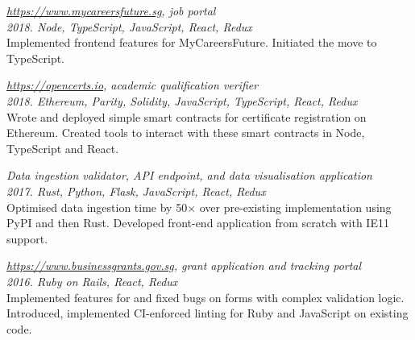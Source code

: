 \documentclass[line, margin]{res}
\begin{document}
\begin{resume}
        \textit{\href{https://www.mycareersfuture.sg}{https://www.mycareersfuture.sg}, job portal} \\
        \textit{2018. Node, TypeScript, JavaScript, React, Redux} \\
        Implemented frontend features for MyCareersFuture. Initiated the move to TypeScript.

        \textit{\href{https://opencerts.io/}{https://opencerts.io}, academic qualification verifier} \\
        \textit{2018. Ethereum, Parity, Solidity, JavaScript, TypeScript, React, Redux} \\
        Wrote and deployed simple smart contracts for certificate registration on Ethereum.
        Created tools to interact with these smart contracts in Node, TypeScript and React.

        \textit{Data ingestion validator, API endpoint, and data visualisation application} \\
        \textit{2017. Rust, Python, Flask, JavaScript, React, Redux} \\
        Optimised data ingestion time by 50$\times$ over pre-existing implementation using PyPI and then Rust.
        Developed front-end application from scratch with IE11 support.

        \textit{\href{https://www.businessgrants.gov.sg/}{https://www.businessgrants.gov.sg}, grant application and tracking portal} \\
        \textit{2016. Ruby on Rails, React, Redux} \\
        Implemented features for and fixed bugs on forms with complex validation logic.
        Introduced, implemented CI-enforced linting for Ruby and JavaScript on existing code.




\end{resume}
\end{document}
